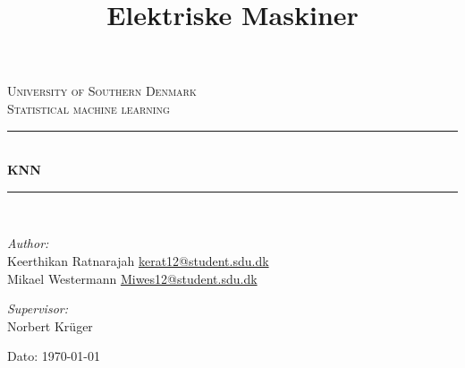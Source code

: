\documentclass[11pt]{report}
\title{Elektriske Maskiner}
\begin{document}
\begin{titlepage}
\begin{center}


\textsc{\LARGE University of Southern Denmark}\\[1.5cm]
\textsc{\Large Statistical machine learning}\\[0.5cm]
\vfill
\hrule ~\\[0.3cm]
{ \huge \bfseries KNN\\[0.4cm] }
\hrule ~\\[1.5cm]
\vfill

\noindent
\begin{minipage}{0.4\textwidth}
\begin{flushleft} \large
\emph{Author:}\\
Keerthikan Ratnarajah
\url{kerat12@student.sdu.dk}\\
Mikael Westermann
\url{Miwes12@student.sdu.dk}
\end{flushleft}
\end{minipage}%
\begin{minipage}{0.4\textwidth}
\begin{flushright} \large
\emph{Supervisor:}\\
Norbert Kr\"{u}ger 
\end{flushright}
\end{minipage}

\vspace{1.2cm}
Dato: \today


\end{center}
\end{titlepage}

\tableofcontents

\newpage









\end{document}
